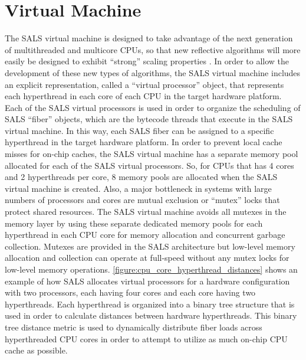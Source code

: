 \section{Virtual Machine}

The SALS virtual machine is designed to take advantage of the next
generation of multithreaded and multicore CPUs, so that new reflective
algorithms will more easily be designed to exhibit ``strong'' scaling
properties \cite[]{sodan:2010}.  In order to allow the development of
these new types of algorithms, the SALS virtual machine includes an
explicit representation, called a ``virtual processor'' object, that
represents each hyperthread in each core of each CPU in the target
hardware platform.  Each of the SALS virtual processors is used in
order to organize the scheduling of SALS ``fiber'' objects, which are
the bytecode threads that execute in the SALS virtual machine.  In
this way, each SALS fiber can be assigned to a specific hyperthread in
the target hardware platform.  In order to prevent local cache misses
for on-chip caches, the SALS virtual machine has a separate memory
pool allocated for each of the SALS virtual processors.  So, for CPUs
that has 4 cores and 2 hyperthreads per core, 8 memory pools are
allocated when the SALS virtual machine is created.  Also, a major
bottleneck in systems with large numbers of processors and cores are
mutual exclusion or ``mutex'' locks that protect shared resources.
The SALS virtual machine avoids all mutexes in the memory layer by
using these separate dedicated memory pools for each hyperthread in
each CPU core for memory allocation and concurrent garbage collection.
Mutexes are provided in the SALS architecture but low-level memory
allocation and collection can operate at full-speed without any mutex
locks for low-level memory operations.
{\mbox{\autoref{figure:cpu_core_hyperthread_distances}}} shows an
example of how SALS allocates virtual processors for a hardware
configuration with two processors, each having four cores and each
core having two hyperthreads.  Each hyperthread is organized into a
binary tree structure that is used in order to calculate distances
between hardware hyperthreads.  This binary tree distance metric is
used to dynamically distribute fiber loads across hyperthreaded CPU
cores in order to attempt to utilize as much on-chip CPU cache as
possible.
